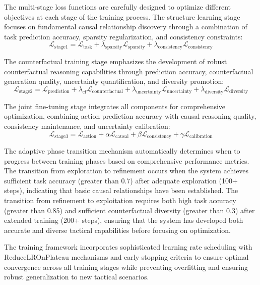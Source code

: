 \documentclass[12pt]{article}
\begin{document}
The multi-stage loss functions are carefully designed to optimize different objectives at each stage of the training process. The structure learning stage focuses on fundamental causal relationship discovery through a combination of task prediction accuracy, sparsity regularization, and consistency constraints:
\begin{equation}
\mathcal{L}_{\text{stage1}} = \mathcal{L}_{\text{task}} + \lambda_{\text{sparsity}} \mathcal{L}_{\text{sparsity}} + \lambda_{\text{consistency}} \mathcal{L}_{\text{consistency}}
\end{equation}

The counterfactual training stage emphasizes the development of robust counterfactual reasoning capabilities through prediction accuracy, counterfactual generation quality, uncertainty quantification, and diversity promotion:
\begin{equation}
\mathcal{L}_{\text{stage2}} = \mathcal{L}_{\text{prediction}} + \lambda_{\text{cf}} \mathcal{L}_{\text{counterfactual}} + \lambda_{\text{uncertainty}} \mathcal{L}_{\text{uncertainty}} + \lambda_{\text{diversity}} \mathcal{L}_{\text{diversity}}
\end{equation}

The joint fine-tuning stage integrates all components for comprehensive optimization, combining action prediction accuracy with causal reasoning quality, consistency maintenance, and uncertainty calibration:
\begin{equation}
\mathcal{L}_{\text{stage3}} = \mathcal{L}_{\text{action}} + \alpha \mathcal{L}_{\text{causal}} + \beta \mathcal{L}_{\text{consistency}} + \gamma \mathcal{L}_{\text{calibration}}
\end{equation}

The adaptive phase transition mechanism automatically determines when to progress between training phases based on comprehensive performance metrics. The transition from exploration to refinement occurs when the system achieves sufficient task accuracy (greater than 0.7) after adequate exploration (100+ steps), indicating that basic causal relationships have been established. The transition from refinement to exploitation requires both high task accuracy (greater than 0.85) and sufficient counterfactual diversity (greater than 0.3) after extended training (200+ steps), ensuring that the system has developed both accurate and diverse tactical capabilities before focusing on optimization.

The training framework incorporates sophisticated learning rate scheduling with ReduceLROnPlateau mechanisms and early stopping criteria to ensure optimal convergence across all training stages while preventing overfitting and ensuring robust generalization to new tactical scenarios.
\end{document}
